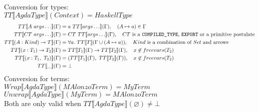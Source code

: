 Conversion for types:\\
\(TT\llbracket AgdaType \rrbracket(Context) = HaskellType \)
\begin{align*}
   TT\llbracket A\ args\ldots \rrbracket(\Gamma) &= a\ TT\llbracket args\ldots \rrbracket(\Gamma),
      \quad (A \mapsto a) \in \Gamma \\
   TT\llbracket CT\ args\ldots \rrbracket(\Gamma) &= CT\ TT\llbracket args\ldots \rrbracket(\Gamma),
      \quad CT\text{ is a \texttt{COMPILED\_TYPE}, \texttt{EXPORT} or a primitive postulate}\\
   TT\llbracket (A : Kind) \rightarrow T \rrbracket(\Gamma) &= \forall a.\ TT\llbracket T \rrbracket(\Gamma \cup (A \mapsto a)),
      \quad Kind\text{ is a combination of \(Set\) and arrows}\\
   TT\llbracket (x : T_1) \rightarrow T_2 \rrbracket(\Gamma) &=
      TT\llbracket T_1 \rrbracket(\Gamma) \rightarrow TT\llbracket T_2 \rrbracket(\Gamma),
      \quad x \not\in freevars(T_2) \\
   TT\llbracket (x : T_1,\ T_2) \rrbracket(\Gamma) &=
      (TT\llbracket T_1 \rrbracket(\Gamma),\ TT\llbracket T_2 \rrbracket(\Gamma)),
      \quad x \not\in freevars(T_2) \\
   TT\llbracket \_ \rrbracket(\Gamma) &= \bot\\
\end{align*}
Conversion for terms:\\
\(Wrap\llbracket AgdaType \rrbracket(MAlonzoTerm) = MyTerm \)\\
\(Unwrap\llbracket AgdaType \rrbracket(MyTerm) = MAlonzoTerm \)\\
Both are only valid when \(TT\llbracket AgdaType \rrbracket(\varnothing) \neq \bot\)
